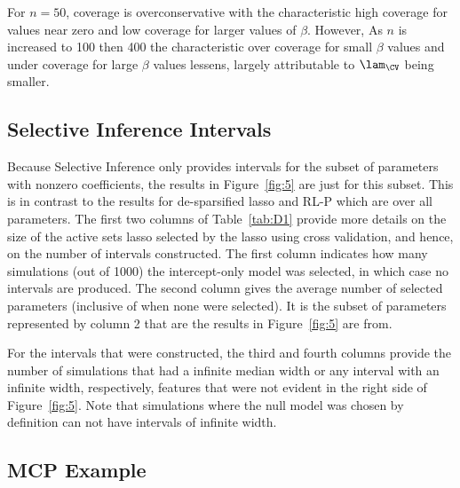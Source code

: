 For $n = 50$, coverage is overconservative with the characteristic high coverage for values near zero and low coverage for larger values of $\beta$. However, As $n$ is increased to 100 then 400 the characteristic over coverage for small $\beta$ values and under coverage for large $\beta$ values lessens, largely attributable to $\lam_{\CV}$ being smaller.

\clearpage

\subsection{Selective Inference Intervals}\label{sup:si_int_info}

\begin{table}[hb]
  \singlespace
  \centering
  
  \caption{Additional information on the results for Selective Inference in the simulation described in Section~\ref{Sec:Comparison}.}
  \label{tab:D1}
\end{table}


Because Selective Inference only provides intervals for the subset of parameters with nonzero coefficients, the results in Figure~\ref{fig:5} are just for this subset. This is in contrast to the results for de-sparsified lasso and RL-P which are over all parameters. The first two columns of Table~\ref{tab:D1} provide more details on the size of the active sets lasso selected by the lasso using cross validation, and hence, on the number of intervals constructed. The first column indicates how many simulations (out of 1000) the intercept-only model was selected, in which case no intervals are produced. The second column gives the average number of selected parameters (inclusive of when none were selected). It is the subset of parameters represented by column 2 that are the results in Figure~\ref{fig:5} are from.

For the intervals that were constructed, the third and fourth columns provide the number of simulations that had a infinite median width or any interval with an infinite width, respectively, features that were not evident in the right side of Figure~\ref{fig:5}. Note that simulations where the null model was chosen by definition can not have intervals of infinite width.

\clearpage


\subsection{MCP Example}\label{sup:MCP}

